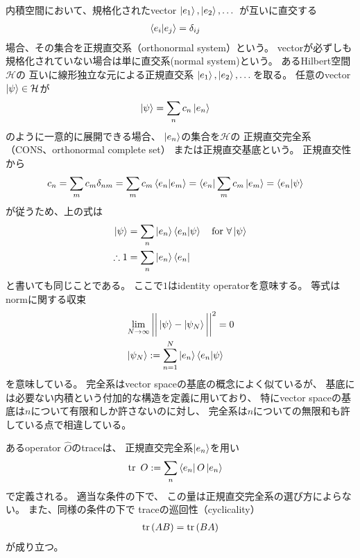 内積空間において、規格化されたvector
$\ket{e_1},\ket{e_2},\dots$
が互いに直交する
\begin{align}
    \braket{e_i | e_j} &= \delta_{ij}
\end{align}
場合、その集合を正規直交系（orthonormal system）という。
vectorが必ずしも規格化されていない場合は単に直交系(normal system)という。
あるHilbert空間$\mathcal{H}$の
互いに線形独立な元による正規直交系
$\ket{e_1},\ket{e_2},\dots$を取る。
任意のvector
$\ket{\psi} \in \mathcal{H}$が
\begin{align}
    \ket{\psi}
    &=\sum_n c_n \ket{e_n}
\end{align}
のように一意的に展開できる場合、
$\ket{e_n}$の集合を$\mathcal{H}$の
正規直交完全系（CONS、orthonormal complete set）
または正規直交基底という。
正規直交性から
\begin{align}
    c_n &=
    \sum_m c_m \delta_{nm}
    =\sum_m c_m \braket{e_n|e_m}
    = \bra{e_n} \sum_m c_m \ket{e_m}
    = \braket{e_n | \psi}
\end{align}
が従うため、上の式は
\begin{align}
    \ket{\psi}
    &=\sum_n \ket{e_n} \braket{e_n | \psi}
    \quad\text{for $\forall \ket{\psi}$}
\notag\\
\therefore
    1
    &=
    \sum _n \ket{e_n}\bra{e_n}
\end{align}
と書いても同じことである。
ここで$1$はidentity operatorを意味する。
等式はnormに関する収束
\begin{subequations}
\begin{align}
    &\lim_{N\to\infty}\bigg|\bigg|
        \ket{\psi} - \ket{\psi_N}
    \bigg|\bigg|^2
    = 0
\label{convergence of norm}
\\
    &\ket{\psi_N}
    :=
    \sum_{n=1}^N \ket{e_n} \braket{e_n | \psi}
\end{align}
\end{subequations}
を意味している。
完全系はvector spaceの基底の概念によく似ているが、
基底には必要ない内積という付加的な構造を定義に用いており、
特にvector spaceの基底は$n$について有限和しか許さないのに対し、
完全系は$n$についての無限和も許している点で相違している。

あるoperator $\hat{O}$のtraceは、
正規直交完全系$\ket{e_n}$を用い
\begin{align}
    \tr\ O
    &:=
    \sum_n\bra{e_n} O \ket{e_n}
\end{align}
で定義される。
適当な条件の下で、
この量は正規直交完全系の選び方によらない。
また、同様の条件の下で
traceの巡回性（cyclicality）
\begin{align}
    \tr\left(
        AB
    \right)
    =
    \tr\left(
        BA
    \right)
\end{align}
が成り立つ。

